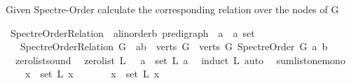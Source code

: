 \begin{isabellebody}
\begin{isamarkuptext}
Given Spectre-Order calculate the corresponding relation over the nodes of G%
\end{isamarkuptext}\isamarkuptrue%
\isamarkupfalse%
\ Spectre{\isacharunderscore}{\kern0pt}Order{\isacharunderscore}{\kern0pt}Relation\ {\isacharcolon}{\kern0pt}{\isacharcolon}{\kern0pt}\ {\isachardoublequoteopen}{\isacharparenleft}{\kern0pt}{\isacharprime}{\kern0pt}a{\isacharcolon}{\kern0pt}{\isacharcolon}{\kern0pt}linorder{\isacharcomma}{\kern0pt}{\isacharprime}{\kern0pt}b{\isacharparenright}{\kern0pt}\ pre{\isacharunderscore}{\kern0pt}digraph\ {\isasymRightarrow}\ {\isacharparenleft}{\kern0pt}{\isacharprime}{\kern0pt}a\ {\isasymtimes}\ {\isacharprime}{\kern0pt}a{\isacharparenright}{\kern0pt}\ set{\isachardoublequoteclose}\isanewline
\ \ \ {\isachardoublequoteopen}Spectre{\isacharunderscore}{\kern0pt}Order{\isacharunderscore}{\kern0pt}Relation\ G\ {\isasymequiv}\ {\isacharbraceleft}{\kern0pt}{\isacharparenleft}{\kern0pt}a{\isacharcomma}{\kern0pt}b{\isacharparenright}{\kern0pt}\ {\isasymin}\ {\isacharparenleft}{\kern0pt}verts\ G\ {\isasymtimes}\ verts\ G{\isacharparenright}{\kern0pt}{\isachardot}{\kern0pt}\ Spectre{\isacharunderscore}{\kern0pt}Order\ G\ a\ b{\isacharbraceright}{\kern0pt}{\isachardoublequoteclose}%
\isadelimdocument
%
\endisadelimdocument
%
\isatagdocument
%
\isamarkuptrue%
%
\endisatagdocument
{\isafolddocument}%
%
\isadelimdocument
%
\endisadelimdocument
{}\isamarkupfalse%
\ \ zero{\isacharunderscore}{\kern0pt}list{\isacharunderscore}{\kern0pt}sound{\isacharcolon}{\kern0pt}\isanewline
\ \ {\isachardoublequoteopen}zero{\isacharunderscore}{\kern0pt}list\ L\ {\isasymequiv}\ {\isasymforall}\ a\ {\isasymin}\ set\ L{\isachardot}{\kern0pt}\ a\ {\isacharequal}{\kern0pt}\ {}{\isachardoublequoteclose}\isanewline
%
\isadelimproof
%
\endisadelimproof
%
\isatagproof
{}\isamarkupfalse%
{\isacharparenleft}{\kern0pt}induct\ L{\isacharcomma}{\kern0pt}\ auto{\isacharparenright}{\kern0pt}\ \isamarkupfalse%
%
\endisatagproof
{\isafoldproof}%
%
\isadelimproof
\isanewline
%
\endisadelimproof
\isanewline
{}\isamarkupfalse%
\ sumlist{\isacharunderscore}{\kern0pt}one{\isacharunderscore}{\kern0pt}mono{\isacharcolon}{\kern0pt}\isanewline
\ \ \ {\isachardoublequoteopen}{\isasymforall}\ x\ {\isasymin}\ set\ L{\isachardot}{\kern0pt}\ x\ {\isasymge}\ {}\ {\isachardoublequoteclose}\isanewline
\ \ \ {\isachardoublequoteopen}{\isasymexists}\ x\ {\isasymin}\ set\ L{\isachardot}{\kern0pt}\ x\ {\isachargreater}{\kern0pt}\ {}{\isachardoublequoteclose}\isanewline

\end{isabellebody}
